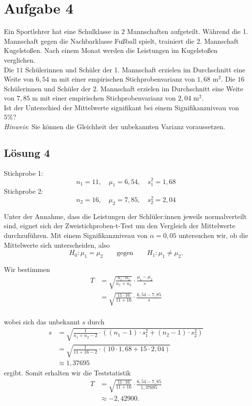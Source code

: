 \documentclass[main.tex]{subfiles}
\begin{document}
\section{Aufgabe 4}
Ein Sportlehrer hat eine Schulklasse in $2$ Mannschaften aufgeteilt. Während die 1. Mannschaft gegen die Nachbarklasse Fußball spielt, trainiert die 2. Mannschaft Kugelstoßen. Nach einem Monat werden die Leistungen im Kugelstoßen verglichen. \\[2mm]
%
Die $11$ Schülerinnen und Schüler der 1. Mannschaft erzielen im Durchschnitt eine Weite von $6,54$ m mit einer empirischen Stichprobenvarianz von $1,68$ m$^{2}$. Die $16$ Schülerinnen und Schüler der 2. Mannschaft erzielen im Durchschnitt eine Weite von $7,85$ m mit einer empirischen Stichprobenvarianz von $2,04$ m$^{2}$. \\[2mm]
%
Ist der Unterschied der Mittelwerte signifikant bei einem Signifikanzniveau von $5\%$? \\[2mm]
%
\textit{Hinweis}: Sie können die Gleichheit der unbekannten Varianz voraussetzen.

\subsection{Lösung 4}

Stichprobe 1: $$
n_1=11,\quad \mu_1 = 6,54,\quad s_1^2=1,68
$$
Stichprobe 2: $$
n_2=16,\quad \mu_2 = 7,85,\quad s_2^2=2,04
$$

Unter der Annahme, dass die Leistungen der Schlüler:innen jeweils normalverteilt sind, eignet sich der Zweistichproben-t-Test um den Vergleich der Mittelwerte durchzuführen. Mit einem Signifikanzniveau von $\alpha = 0,05$ untersuchen wir, ob die Mittelwerte sich unterscheiden, also $$
    H_0: \mu_1 = \mu_2 \qquad \text{gegen} \qquad H_1: \mu_1 \neq \mu_2.
$$

Wir bestimmen $$\begin{aligned}
    T &= \sqrt{\frac{n_1\cdot n_2}{n_1+n_2}} \cdot \frac{\mu_1 - \mu_2}{s} \\
    &= \sqrt{\frac{11\cdot 16}{11+16}} \cdot \frac{6,54 - 7,85}{s} \\
\end{aligned}$$

wobei sich das unbekannt $s$ durch $$\begin{aligned}
    s &= \sqrt{\frac{1}{n_1+n_2 -2} \cdot \left((n_1 - 1) \cdot s^2_1 + (n_2 - 1) \cdot s^2_2\right)} \\[3mm]
    &= \sqrt{\frac{1}{11 + 16 -2} \cdot \left(10\cdot 1,68 + 15\cdot 2,04\right)} \\[3mm]
    &\approx 1,37695
\end{aligned}$$
ergibt. Somit erhalten wir die Teststatistik
$$\begin{aligned}
    T &= \sqrt{\frac{11\cdot 16}{11+16}} \cdot \frac{6,54 - 7,85}{1,37695} \\
    &\approx -2,42900.
\end{aligned}$$
\end{document}
